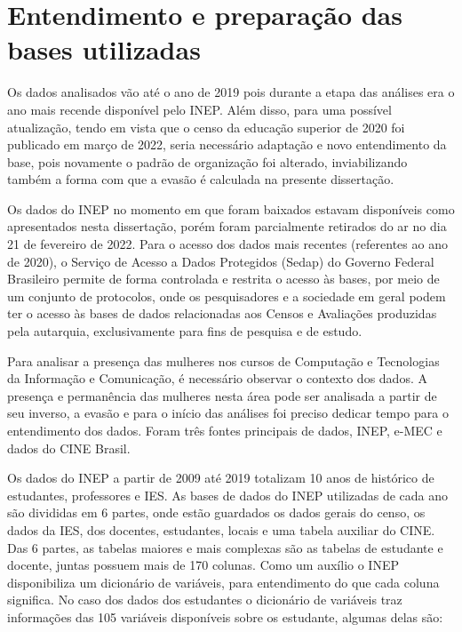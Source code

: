 \section{Entendimento e preparação das bases utilizadas}\label{sec:EntendimentoDados}

Os dados analisados vão até o ano de 2019 pois durante a etapa das análises era o ano mais recende disponível pelo INEP. Além disso, para uma possível atualização, tendo em vista que o censo da educação superior de 2020 foi publicado em março de 2022, seria necessário adaptação e novo entendimento da base, pois novamente o padrão de organização foi alterado, inviabilizando também a forma com que a evasão é calculada na presente dissertação.

Os dados do INEP no momento em que foram baixados estavam disponíveis como apresentados nesta dissertação, porém foram parcialmente retirados do ar no dia 21 de fevereiro de 2022. Para o acesso dos dados mais recentes (referentes ao ano de 2020), o Serviço de Acesso a Dados Protegidos (Sedap) do Governo Federal Brasileiro permite de forma controlada e restrita o acesso às bases, por meio de um conjunto de protocolos, onde os pesquisadores e a sociedade em geral podem ter o acesso às bases de dados relacionadas aos Censos e Avaliações produzidas pela autarquia, exclusivamente para fins de pesquisa e de estudo.

Para analisar a presença das mulheres nos cursos de Computação e Tecnologias da Informação e Comunicação, é necessário observar o contexto dos dados. A presença e permanência das mulheres nesta área pode ser analisada a partir de seu inverso, a evasão e para o início das análises foi preciso dedicar tempo para o entendimento dos dados. Foram três fontes principais de dados, INEP, e-MEC e dados do CINE Brasil. 

Os dados do INEP a partir de 2009 até 2019 totalizam 10 anos de histórico de estudantes, professores e IES. As bases de dados do INEP utilizadas de cada ano são divididas em 6 partes, onde estão guardados os dados gerais do censo, os dados da IES, dos docentes, estudantes, locais e uma tabela auxiliar do CINE. Das 6 partes, as tabelas maiores e mais complexas são as tabelas de estudante e docente, juntas possuem mais de 170 colunas. Como um auxílio o INEP disponibiliza um dicionário de variáveis, para entendimento do que cada coluna significa. No caso dos dados dos estudantes o dicionário de variáveis traz informações das 105 variáveis disponíveis sobre os estudante, algumas delas são:

